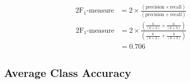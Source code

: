\documentclass[xcolor={table}]{beamer}
\begin{document}
 \begin{frame} 
\begin{alignat}{2}
\text{F$_1$-measure} & = 2 \times \frac{\left(\text{precision} \times \text{recall} \right)}{\left(\text{precision} + \text{recall}\right)}
\label{eqn:f1Measure}
\end{alignat}
\pause
\begin{alignat*}{2}
\text{F$_1$-measure} & = 2 \times \frac{\left(\frac{6}{\left(6 + 2\right)} \times  \frac{6}{\left(6 + 3\right)} \right)}{\left(\frac{6}{\left(6 + 2\right)} +  \frac{6}{\left(6 + 3\right)} \right)} \\
 & = 0.706
\end{alignat*}
\end{frame} 

\subsection{Average Class Accuracy}
\end{document}
